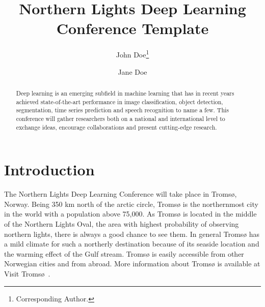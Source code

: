 \documentclass[abstract]{nldl}
\title{Northern Lights Deep Learning Conference Template}
\author[1]{John Doe\thanks{Corresponding Author.}}
\author[1,2]{Jane Doe}
\affil[1]{Affiliation 1}
\affil[2]{Affiliation 2}
\affil[ ]{\texttt{\{john.doe, jane.doe\}@affiliation.com}}
\begin{document}
\maketitle

\begin{abstract}
Deep learning is an emerging subfield in machine learning that has in recent years achieved state-of-the-art performance in image classification, object detection, segmentation, time series prediction and speech recognition to name a few.
This conference will gather researchers both on a national and international level to exchange ideas, encourage collaborations and present cutting-edge research.
\end{abstract}

\section{Introduction}
The Northern Lights Deep Learning Conference will take place in Troms{\o}, Norway.
Being 350 km north of the arctic circle, Troms{\o} is the northernmost city in the world with a population above 75,000.
As Troms{\o} is located in the middle of the Northern Lights Oval, the area with highest probability of observing northern lights, there is always a good chance to see them.
In general Troms{\o} has a mild climate for such a northerly destination because of its seaside location and the warming effect of the Gulf stream.
Troms{\o} is easily accessible from other Norwegian cities and from abroad.
More information about Troms{\o} is available at Visit Troms{\o}~\cite{tromso}.
\end{document}
